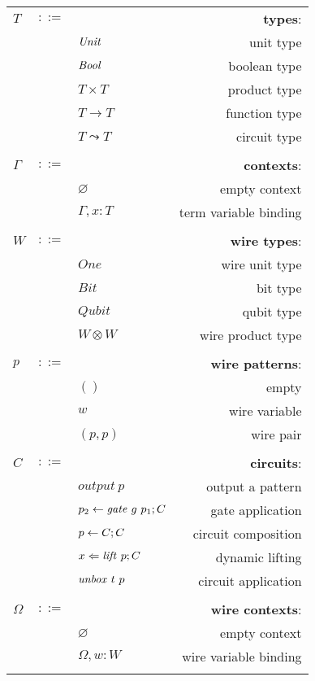 \documentclass[12pt]{article}
\begin{document}
\begin{longtable}[c]{lclr}
  $T$ &$::=$ &  &\textbf{types}: \\
      & &$\mathit{Unit}$ &unit type\\
      & &$\mathit{Bool}$ &boolean type \\
      & &$T\times T$ &product type\\
      & &$T\to T$ &function type\\
      & &$T\leadsto T$ &circuit type\\
  \\

  $\Gamma$ &$::=$ &  &\textbf{contexts}: \\
      & &$\varnothing$ &empty context\\
      & &$\Gamma,x:T$ &term variable binding\\
  \\


  $W$ &$::=$ &  &\textbf{wire types}: \\
      & &$One$ &wire unit type\\
      & &$Bit$ &bit type \\
      & &$Qubit$ &qubit type \\
      & &$W \otimes W$ &wire product type \\
  \\

  $p$ &$::=$ &  &\textbf{wire patterns}: \\
      & &$()$ &empty\\
      & &$w$ &wire variable \\
      & &$(p,p)$ &wire pair \\
  \\

  $C$ &$::=$ &  &\textbf{circuits}: \\
      & &$\mathit{output}\ p$ &output a pattern \\
      & &$p_2 \leftarrow \mathit{gate}\ g\ p_1 ; C$ &gate application \\
      & &$p \leftarrow C ; C$ &circuit composition \\
      & &$x \From \lift\ p ; C$ &dynamic lifting \\
      & &$\unbox\ t\ p$ &circuit application \\
  \\

  $\Omega$ &$::=$ &  &\textbf{wire contexts}: \\
      & &$\varnothing$ &empty context\\
      & &$\Omega,w:W$ &wire variable binding\\
  \\

  \bottomrule
  
\end{longtable}
\end{document}
